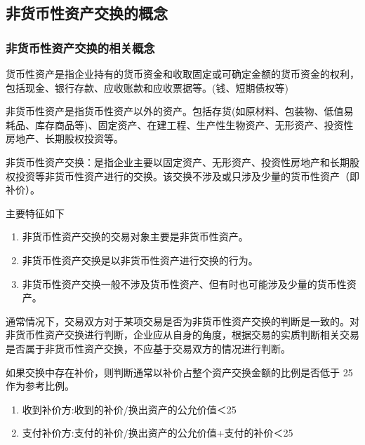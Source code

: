 \documentclass[UTF8,12pt]{ctexart}
\numberwithin{equation}{section} %
\numberwithin{figure}{section}
\numberwithin{table}{section}
\begin{document}
	\subsection{非货币性资产交换的概念}
	\subsubsection{非货币性资产交换的相关概念}
	货币性资产是指企业持有的货币资金和收取固定或可确定金额的货币资金的权利，包括现金、银行存款、应收账款和应收票据等。(钱、短期债权等)
	
	非货币性资产是指货币性资产以外的资产。包括存货(如原材料、包装物、低值易耗品、库存商品等)、固定资产、在建工程、生产性生物资产、无形资产、投资性房地产、长期股权投资等。
	
	非货币性资产交换：是指企业主要以固定资产、无形资产、投资性房地产和长期股权投资等非货币性资产进行的交换。该交换不涉及或只涉及少量的货币性资产（即补价）。
	
	主要特征如下
	\begin{enumerate}
		\item 非货币性资产交换的交易对象主要是非货币性资产。
		
		\item 非货币性资产交换是以非货币性资产进行交换的行为。
		
		\item 非货币性资产交换一般不涉及货币性资产、但有时也可能涉及少量的货币性资产。
		
 	\end{enumerate}
	
	通常情况下，交易双方对于某项交易是否为非货币性资产交换的判断是一致的。对非货币性资产交换进行判断，企业应从自身的角度，根据交易的实质判断相关交易是否属于非货币性资产交换，不应基于交易双方的情况进行判断。
	
	如果交换中存在补价，则判断通常以补价占整个资产交换金额的比例是否低于 25作为参考比例。
	\begin{enumerate}
		\item 收到补价方:收到的补价/换出资产的公允价值＜25
		
		\item 支付补价方:支付的补价/换出资产的公允价值+支付的补价＜25
	\end{enumerate}
	
\end{document}
